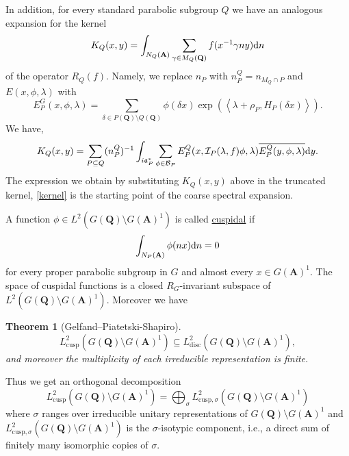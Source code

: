 \documentclass[11pt]{amsart}
\def\A{\mathbf A}
\def\Q{\mathbf Q}
\def\BBB{\mathcal B}
\def\III{\mathcal I}
\def\aaa{\mathfrak a}
\def\d{\text d}
\def\bs{\setminus} 			%
\def\cusp{\text{cusp}}
\def\disc{\text{disc}}
\def\Ltwo{L^2}
\def\sprod#1#2{\left\langle #1 , #2 \right\rangle}  %
\newtheorem{theorem}{Theorem}[section]
\theoremstyle{remark}
\begin{document}
In addition, for every standard parabolic subgroup $Q$ we have an analogous expansion for the kernel 
\[ K_Q(x, y) = \int_{N_Q(\A)} \sum_{\gamma \in M_Q(\Q)} f(x^{-1}\gamma n y) \d n \]
of the operator $R_Q(f)$. Namely, we replace $n_P$ with $n_P^Q = n_{M_Q \cap P}$ and $E(x, \phi, \lambda)$ with \[ E_P^G(x, \phi, \lambda) = \sum_{\delta \in P(\Q) \bs Q(\Q)} \phi(\delta x) \exp(\sprod{\lambda + \rho_P}{H_P(\delta x)}). \]
We have, 
\[ K_Q(x, y) = \sum_{P \subseteq Q} (n_P^Q)^{-1} \int_{i\aaa_P^*} \sum_{\phi \in \BBB_P}
		E_P^Q(x, \III_P(\lambda, f)\phi, \lambda) \overline{E_P^Q(y, \phi, \lambda)} \d y. \]
The expression we obtain by substituting $K_Q(x, y)$ above in the truncated kernel, \cref{kernel} is the starting point of the coarse spectral expansion. 

A function $\phi \in \Ltwo(G(\Q) \bs G(\A)^1)$ is called \underline{cuspidal} if 
\[ \int_{N_P(\A)} \phi(nx) \d n = 0 \]
for every proper parabolic subgroup in $G$ and almost every $x \in G(\A)^1$. The space of cuspidal functions is a closed $R_G$-invariant subspace of $\Ltwo(G(\Q)\bs G(\A)^1)$. Moreover we have
\begin{theorem} [Gelfand--Piatetski-Shapiro]
	\[ \Ltwo_\cusp(G(\Q)\bs G(\A)^1) \subseteq \Ltwo_\disc(G(\Q)\bs G(\A)^1), \]
	and moreover the multiplicity of each irreducible representation is finite. 
\end{theorem}
Thus we get an orthogonal decomposition
\[ \Ltwo_\cusp(G(\Q)\bs G(\A)^1) = \bigoplus_\sigma \Ltwo_{\cusp, \sigma} (G(\Q)\bs G(\A)^1) \]
where $\sigma$ ranges over irreducible unitary representations of $G(\Q)\bs G(\A)^1$ and $\Ltwo_{\cusp, \sigma} (G(\Q)\bs G(\A)^1)$ is the $\sigma$-isotypic component, i.e., a direct sum of finitely many isomorphic copies of $\sigma$. 
\end{document}

